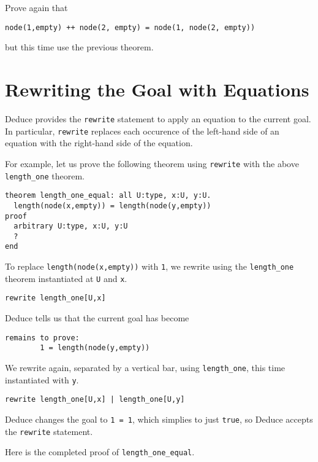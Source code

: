 \documentclass[12pt]{article}
\begin{document}
\noindent Prove again that 
\begin{verbatim}
node(1,empty) ++ node(2, empty) = node(1, node(2, empty))
\end{verbatim}
but this time use the previous theorem.

\pagebreak

\section{Rewriting the Goal with Equations}
\label{sec:rewriting-goal}

Deduce provides the \texttt{rewrite} statement to apply an equation to the
current goal. In particular, \texttt{rewrite} replaces each occurence of the
left-hand side of an equation with the right-hand side of the
equation.

For example, let us prove the following theorem using \texttt{rewrite}
with the above \texttt{length\_one} theorem.

\begin{verbatim}
theorem length_one_equal: all U:type, x:U, y:U.
  length(node(x,empty)) = length(node(y,empty))
proof
  arbitrary U:type, x:U, y:U
  ?
end
\end{verbatim}

To replace \texttt{length(node(x,empty))} with \texttt{1}, we rewrite
using the \texttt{length\_one} theorem instantiated at \texttt{U} and \texttt{x}.

\begin{verbatim}
rewrite length_one[U,x]
\end{verbatim}

\noindent Deduce tells us that the current goal has become

\begin{verbatim}
remains to prove:
        1 = length(node(y,empty))
\end{verbatim}

\noindent We rewrite again, separated by a vertical bar, using
\texttt{length\_one}, this time instantiated with \texttt{y}.

\begin{verbatim}
rewrite length_one[U,x] | length_one[U,y]
\end{verbatim}

\noindent Deduce changes the goal to \texttt{1 = 1}, which simplies to
just \texttt{true}, so Deduce accepts the \texttt{rewrite} statement.

Here is the completed proof of \texttt{length\_one\_equal}.
\end{document}
